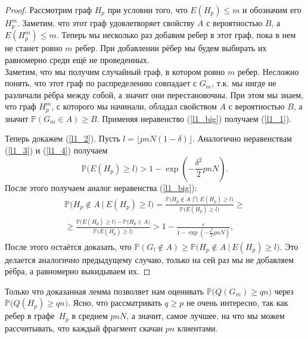 \documentclass{matmex-diploma-custom}
\newcommand{\PRob}{\mathbb P}
\newcommand{\leqs}{\leqslant}
\newcommand{\geqs}{\geqslant}
\newcommand{\eps}{\varepsilon}
\theoremstyle{named}
\begin{document}
\begin{proof}
Рассмотрим граф $H_p$ при условии того, что $E(H_p) \leqs m$ и обозначим его $H_p^m$. 
Заметим, что этот граф удовлетворяет свойству $A$ с вероятностью $B$, а $E(H_p^m) \leqs m$.
Теперь мы несколько раз добавим ребер в этот граф, пока в нем не станет ровно $m$ ребер. 
При добавлении рёбер мы будем выбирать их равномерно среди ещё не проведенных.
\\
Заметим, что мы получим случайный граф, в котором ровно $m$ ребер. Несложно понять, 
что этот граф по распределению совпадает с $G_m$, т.к. мы нигде не различали рёбра между собой, а значит они перестановочны.
При этом мы знаем, что граф $H_p^m$, с которого мы начинали, обладал свойством $A$ с вероятностью $B$, 
а значит $\PRob(G_m \in A) \geqs B$. Применяя неравенство (\ref{l1_big}) получаем (\ref{l1_1}).

Теперь докажем (\ref{l1_2}). Пусть $l = \lfloor pnN(1-\delta) \rfloor$. Аналогично неравенствам (\ref{l1_3}) и (\ref{l1_4}) получаем
\begin{equation} \label{l1_5}
\PRob\big( E(H_p) \geqs l \big) > 1 - \exp\left(-\frac{\delta^2}{2}pnN\right).
\end{equation}
После этого получаем аналог неравенства (\ref{l1_big}):
\begin{equation}\label{l1_big2}
\begin{aligned}
	\PRob\Big( H_p \not\in A~\big|~E(H_p) \geqs l \Big)
=
	\frac{
		\PRob\Big( H_p \not\in A~\bigcap~E(H_p) \geqs l \Big)
	}{
		\PRob\big(E(H_p) \geqs l \big)
	} 
\geqs
\\
\geqs
	\frac{
		\PRob\big(E(H_p) \geqs l \big) 
			-
		\PRob\big(H_p \in A \big)
	}{
		\PRob\big(E(H_p) \geqs l\big)
	}
>
	1
		-
	\frac{\eps}{
		1 - \exp\left(-\frac{\delta^2}{2}pnN\right)
	},
\end{aligned}\end{equation}
После этого остаётся доказать, что $\PRob(G_l \not\in A) \geqs \PRob\Big( H_p \not\in A~\big|~ E(H_p) \geqs l \Big)$.
Это делается аналогично предыдущему случаю, только на сей раз мы не добавляем рёбра, а равномерно выкидываем их.
\end{proof}

\bigskip

Только что доказанная лемма позволяет нам оценивать $\PRob\big(Q(G_m) \geqs qn\big)$ через $\PRob\big(Q(H_p) \geqs q n\big)$.
Ясно, что рассматривать $q \geqs p$ не очень интересно, так как ребер в графе~$H_p$ в среднем $p nN$, 
а значит, самое лучшее, на что мы можем рассчитывать, что каждый фрагмент скачан $p  n$ клиентами.
\end{document}

